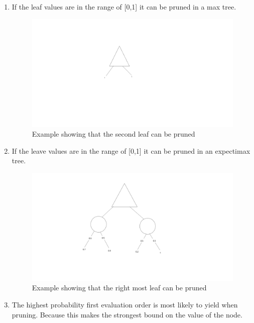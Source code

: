 \documentclass[letterpaper, 12pt]{article}
\begin{document}
\begin{enumerate}
\begin{enumerate}
        \item If the leaf values are in the range of [0,1] it can be pruned in a max tree.
        \begin{figure}[H]
            \centering
            \includegraphics[width=.8\linewidth]{q3.e.png}
            \caption{Example showing that the second leaf can be pruned}
        \end{figure} 
        \item If the leave values are in the range of [0,1] it can be pruned in an expectimax tree.
        \begin{figure}[H]
            \centering
            \includegraphics[width=.8\linewidth]{q3.f.png}
            \caption{Example showing that the right most leaf can be pruned}
        \end{figure} 
        \item The highest probability first evaluation order is most likely to yield when pruning.
            Because this makes the strongest bound on the value of the node. 
        

\end{enumerate}
\end{enumerate}
\end{document}
